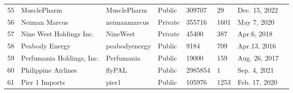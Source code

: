 \documentclass[9pt,twoside,lineno]{pnas-new}
\begin{document}
\begin{longtable}{llllllll}
55          & MusclePharm                                                                     & MusclePharm                                                         & Public           & 309707             & 29                 & Dec. 15, 2022                                                                                                                     \\
56          & Neiman Marcus                                                                   & neimanmarcus                                                        & Private          & 355716             & 1601               & May 7, 2020                                                                                                                           \\
57          & Nine West Holdings Inc.                                                         & NineWest                                                            & Private          & 45400              & 387                & Apr.6, 2018                                                                                                                         \\
58          & Peabody Energy                                                                  & peabodyenergy                                                       & Public           & 9184               & 709                & Apr.13, 2016                                                                                                                        \\
59          & Perfumania Holdings, Inc.                                                       & Perfumania                                                          & Public           & 19000              & 159                & Aug. 26, 2017                                                                                                                       \\
60          & Philippine Airlines                                                             & flyPAL                                                              & Public          & 2985854            & 1                  & Sep. 4, 2021                                                                                                                     \\
61          & Pier 1 Imports                                                                  & pier1                                                               & Public           & 105976             & 1253               & Feb. 17, 2020                                                                                                                     \\

\end{longtable}
\end{document}
